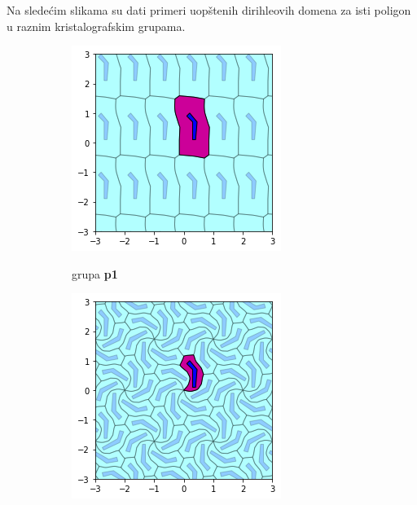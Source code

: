 \documentclass[11pt]{article}
\begin{document}
\begin{samepage}
 Na slede\' cim slikama su dati primeri uop\v stenih dirihleovih domena za isti poligon u raznim kristalografskim grupama.
 \begin{figure}[H]

  \begin{subfigure}[b]{0.3\textwidth}
    \includegraphics[width=\textwidth]{output_21_1.png}
    \label{fig:f20}
    \caption{grupa \textbf{p1}}
  \end{subfigure}
  \begin{subfigure}[b]{0.3\textwidth}
    \includegraphics[width=\textwidth]{output_21_2.png}

\end{subfigure}
\end{figure}
\end{samepage}
\end{document}
